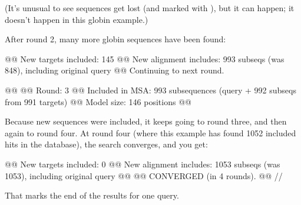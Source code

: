 (It's unusual to see sequences get lost (and marked with \ccode{-}),
but it can happen; it doesn't happen in this globin example.)

After round 2, many more globin sequences have been found:

\begin{sreoutput}
@@ New targets included:   145
@@ New alignment includes: 993 subseqs (was 848), including original query
@@ Continuing to next round.

@@
@@ Round:                  3
@@ Included in MSA:        993 subsequences (query + 992 subseqs from 991 targets)
@@ Model size:             146 positions
@@
\end{sreoutput}

Because new sequences were included, it keeps going to round three,
and then again to round four. At round four (where this example has
found 1052 included hits in the database), the search converges, and
you get:

\begin{sreoutput}
@@ New targets included:   0
@@ New alignment includes: 1053 subseqs (was 1053), including original query
@@
@@ CONVERGED (in 4 rounds). 
@@
//
\end{sreoutput}

That \ccode{//} marks the end of the results for one query.










